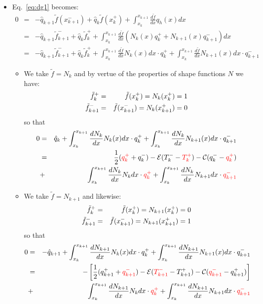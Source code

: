 \begin{itemize}
\item Eq.~\ref{eq:dg1} becomes:
\begin{eqnarray}
0 &=&
-\hat{q}_{k+1} \tilde{f}(x_{k+1}^-)
+\hat{q}_k     \tilde{f}(x_k^+)
+ \int_{x_k}^{x_{k+1}} \frac{d\tilde{f}}{dx} q_h(x) dx  \nonumber\\
&=&-\hat{q}_{k+1} \tilde{f}_{k+1}^-
+\hat{q}_k     \tilde{f}_k^+
+ \int_{x_k}^{x_{k+1}} \frac{d\tilde{f}}{dx} ( N_k(x) q_k^+ + N_{k+1}(x)q_{k+1}^- ) dx \nonumber\\
&=& -\hat{q}_{k+1} \tilde{f}_{k+1}^-
+\hat{q}_k     \tilde{f}_k^+
+ \int_{x_k}^{x_{k+1}} \frac{d\tilde{f}}{dx} N_k(x) dx \cdot q_k^+ 
+ \int_{x_k}^{x_{k+1}} \frac{d\tilde{f}}{dx} N_{k+1}(x) dx \cdot q_{k+1}^- 
\end{eqnarray}

\begin{itemize}
\item We take $\tilde{f}=N_k$ and by vertue of the properties of shape functions $N$ we have: 
\begin{eqnarray}
\tilde{f}_k^+&=&\tilde{f}(x_k^+) = N_k(x_k^+)=1 \nonumber\\
\tilde{f}_{k+1}^-&=&\tilde{f}(x_{k+1}^-)   = N_k(x_{k+1}^+)=0 \nonumber
\end{eqnarray}
so that 
\begin{eqnarray}
0 
&=& \hat{q}_k   
+ \int_{x_k}^{x_{k+1}} \frac{dN_k}{dx} N_k(x) dx \cdot q_k^+ 
+ \int_{x_k}^{x_{k+1}} \frac{dN_k}{dx} N_{k+1}(x) dx \cdot q_{k+1}^- \nonumber\\ 
&=& 
\frac{1}{2}({\color{red}q_k^+} + q_k^-) - {\cal E} (T_k^- - {\color{red}T_k^+}) 
- {\cal C}(q_k^- - {\color{red}q_k^+}) \nonumber\\
&+& \int_{x_k}^{x_{k+1}} \frac{dN_k}{dx} N_k dx \cdot {\color{red}q_k^+ }
+ \int_{x_k}^{x_{k+1}} \frac{dN_k}{dx} N_{k+1} dx \cdot {\color{red} q_{k+1}^-} \label{eq:dg4}
\end{eqnarray}

\item We take $\tilde{f}=N_{k+1}$ and likewise:
\begin{eqnarray}
\tilde{f}_k^+&=&\tilde{f}(x_k^+) = N_{k+1}(x_k^+)=0 \nonumber\\
\tilde{f}_{k+1}^-&=&\tilde{f}(x_{k+1}^-)   = N_{k+1}(x_{k+1}^+)=1 \nonumber
\end{eqnarray}
so that 
\begin{eqnarray}
0 
&=& -\hat{q}_{k+1} 
+ \int_{x_k}^{x_{k+1}} \frac{dN_{k+1}}{dx} N_k(x) dx \cdot q_k^+ 
+ \int_{x_k}^{x_{k+1}} \frac{dN_{k+1}}{dx} N_{k+1}(x) dx \cdot q_{k+1}^- \nonumber\\ 
&=& - \left[
\frac{1}{2}(q_{k+1}^+ + {\color{red}q_{k+1}^-}) - {\cal E} ({\color{red}T_{k+1}^-} 
- T_{k+1}^+) -{\cal C}({\color{red}q_{k+1}^-} - q_{k+1}^+) 
\right]\nonumber\\
&+& \int_{x_k}^{x_{k+1}} \frac{dN_{k+1}}{dx} N_k dx \cdot {\color{red}q_k^+} 
+ \int_{x_k}^{x_{k+1}} \frac{dN_{k+1}}{dx} N_{k+1}dx \cdot {\color{red}q_{k+1}^-}  \label{eq:dg6}
\end{eqnarray}




\end{itemize}
\end{itemize}
